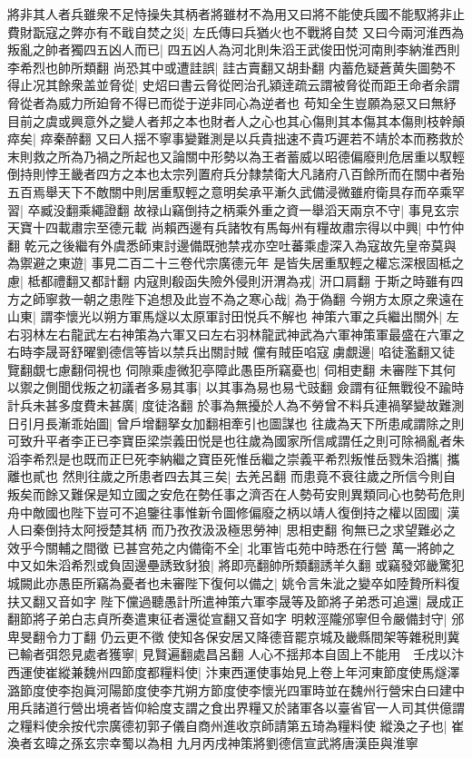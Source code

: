 將非其人者兵雖衆不足恃操失其柄者將雖材不為用又曰將不能使兵國不能馭將非止費財翫寇之弊亦有不戢自焚之災|{
	左氏傳曰兵猶火也不戰將自焚}
又曰今兩河淮西為叛亂之帥者獨四五凶人而已|{
	四五凶人為河北則朱滔王武俊田悦河南則李納淮西則李希烈也帥所類翻}
尚恐其中或遭詿誤|{
	詿古賣翻又胡卦翻}
内蓄危疑蒼黄失圖勢不得止况其餘衆盖並脅從|{
	史炤曰書云脅從罔治孔潁逹疏云謂被脅從而距王命者余謂脅從者為威力所廹脅不得已而從于逆非同心為逆者也}
苟知全生豈願為惡又曰無紓目前之虞或興意外之變人者邦之本也財者人之心也其心傷則其本傷其本傷則枝幹顛瘁矣|{
	瘁秦醉翻}
又曰人揺不寧事變難測是以兵貴拙速不貴巧遲若不靖於本而務救於末則救之所為乃禍之所起也又論關中形勢以為王者蓄威以昭德偏廢則危居重以馭輕倒持則悖王畿者四方之本也太宗列置府兵分隸禁衛大凡諸府八百餘所而在關中者殆五百焉舉天下不敵關中則居重馭輕之意明矣承平漸久武備浸微雖府衛具存而卒乘罕習|{
	卒臧没翻乘繩證翻}
故禄山竊倒持之柄乘外重之資一舉滔天兩京不守|{
	事見玄宗天寶十四載肅宗至德元載}
尚賴西邊有兵諸牧有馬每州有糧故肅宗得以中興|{
	中竹仲翻}
乾元之後繼有外虞悉師東討邊備既弛禁戎亦空吐蕃乘虛深入為寇故先皇帝莫與為禦避之東遊|{
	事見二百二十三卷代宗廣德元年}
是皆失居重馭輕之權忘深根固柢之慮|{
	柢都禮翻又都計翻}
内寇則殽函失險外侵則汧渭為戎|{
	汧口肩翻}
于斯之時雖有四方之師寧救一朝之患陛下追想及此豈不為之寒心哉|{
	為于偽翻}
今朔方太原之衆遠在山東|{
	謂李懷光以朔方軍馬燧以太原軍討田悦兵不解也}
神策六軍之兵繼出關外|{
	左右羽林左右龍武左右神策為六軍又曰左右羽林龍武神武為六軍神策軍最盛在六軍之右時李晟哥舒曜劉德信等皆以禁兵出關討賊}
儻有賊臣啗寇虜覷邊|{
	啗徒濫翻又徒覽翻覷七慮翻伺視也}
伺隙乘虛微犯亭障此愚臣所竊憂也|{
	伺相吏翻}
未審陛下其何以禦之側聞伐叛之初議者多易其事|{
	以其事為易也易弋豉翻}
僉謂有征無戰役不踰時計兵未甚多度費未甚廣|{
	度徒洛翻}
於事為無擾於人為不勞曾不料兵連禍拏變故難測日引月長漸乖始圖|{
	曾戶增翻拏女加翻相牽引也圖謀也}
往歲為天下所患咸謂除之則可致升平者李正已李寶臣梁崇義田悦是也往歲為國家所信咸謂任之則可除禍亂者朱滔李希烈是也既而正巳死李納繼之寶臣死惟岳繼之崇義平希烈叛惟岳戮朱滔攜|{
	攜離也貳也}
然則往歲之所患者四去其三矣|{
	去羌呂翻}
而患竟不衰往歲之所信今則自叛矣而餘又難保是知立國之安危在勢任事之濟否在人勢苟安則異類同心也勢苟危則舟中敵國也陛下豈可不追鑒往事惟新令圖修偏廢之柄以靖人復倒持之權以固國|{
	漢人曰秦倒持太阿授楚其柄}
而乃孜孜汲汲極思勞神|{
	思相吏翻}
徇無已之求望難必之效乎今關輔之間徵已甚宫苑之内備衛不全|{
	北軍皆屯苑中時悉在行營}
萬一將帥之中又如朱滔希烈或負固邊壘誘致豺狼|{
	將即亮翻帥所類翻誘羊久翻}
或竊發郊畿驚犯城闕此亦愚臣所竊為憂者也未審陛下復何以備之|{
	姚令言朱泚之變卒如陸贄所料復扶又翻又音如字}
陛下儻過聽愚計所遣神策六軍李晟等及節將子弟悉可追還|{
	晟成正翻節將子弟白志貞所奏遣東征者還從宣翻又音如字}
明敕涇隴邠寧但令嚴備封守|{
	邠卑旻翻令力丁翻}
仍云更不徵使知各保安居又降德音罷京城及畿縣間架等雜税則冀已輸者弭怨見處者獲寧|{
	見賢遍翻處昌呂翻}
人心不揺邦本自固上不能用　壬戌以汴西運使崔縱兼魏州四節度都糧料使|{
	汴東西運使事始見上卷上年河東節度使馬燧澤潞節度使李抱眞河陽節度使李芁朔方節度使李懷光四軍時並在魏州行營宋白曰建中用兵諸道行營出境者皆仰給度支謂之食出界糧又於諸軍各以臺省官一人司其供億謂之糧料使余按代宗廣德初郭子儀自商州進收京師請第五琦為糧料使}
縱渙之子也|{
	崔渙者玄暐之孫玄宗幸蜀以為相}
九月丙戌神策將劉德信宣武將唐漢臣與淮寧

